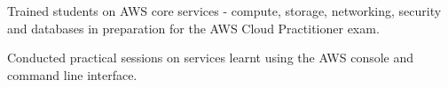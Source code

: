\documentclass[letterpaper]{deedy-resume} %
\begin{document}
\begin{minipage}[t]{0.66\textwidth}
\sectionspace %



\vspace{\topsep} %
\begin{tightitemize}
\item Trained students on AWS core services - compute, storage, networking, security and databases in preparation for the AWS Cloud Practitioner exam.
\item Conducted practical sessions on services learnt using the AWS console and command line interface.
\end{tightitemize}

\sectionspace %








\end{minipage}
\end{document}
